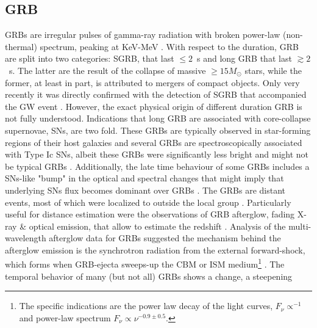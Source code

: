 \subsection{\ac{GRB}}

\acp{GRB} are irregular pulses of gamma-ray radiation with broken power-law 
(non-thermal) spectrum, peaking at KeV-MeV \citep{Band:1993,Kouveliotou:1993,Meegan:1992xg}.
%
With respect to the duration, \ac{GRB} are split into two categories: \ac{SGRB}, 
that last ${\leq}2$~s and long \ac{GRB} that last ${\gtrsim}2$~s. The latter are the 
result of the collapse of massive ${\geq}15M_{\odot}$ stars, while the former, at 
least in part, is attributed to mergers of compact objects. Only very recently it 
was directly confirmed with the detection of \ac{SGRB} \GRB{} that accompanied 
the \ac{GW} event \GW{} \citep{TheLIGOScientific:2017qsa}. However, the exact physical 
origin of different duration \ac{GRB} is not fully understood.
%
Indications that long \ac{GRB} are associated with core-collapse supernovae, \acp{SN}, 
are two fold. These \acp{GRB} are typically observed in star-forming regions of their 
host galaxies \citep[\eg][]{Bloom:2000pq,Bloom:2002hc,Fruchter:2006py,Christensen:2004yx,CastroCeron:2006jh} 
and several \acp{GRB} are spectroscopically associated with Type Ic \acp{SN}, albeit 
these \acp{GRB} were significantly less bright and might not be typical \acp{GRB} 
\citep[\eg][]{Liang:2006ci,Bromberg:2011fm}. Additionally, the late time behaviour 
of some \acp{GRB} includes a \acp{SN}-like "bump" in the optical and spectral changes 
that might imply that underlying \acp{SN} flux becomes dominant over \acp{GRB} 
\citep[\eg][]{Bloom:1999,Woosley:2006fn}.
%
The \acp{GRB} are distant events, most of which were localized to outside the local 
group \citep[\eg][]{Mao:1992,Piran:1992,Fenimore:1993}. Particularly useful for distance 
estimation were the observations of \ac{GRB} afterglow, fading X-ray \& optical emission, 
that allow to estimate the redshift \citep[\eg][]{Costa:1997cg,Frontera:1997ae}.
%
Analysis of the multi-wavelength afterglow data for \acp{GRB} \citep[\eg][]{Panaitescu:2001bx} 
suggested the mechanism behind the afterglow emission is the synchrotron radiation from the 
external forward-shock, which forms when \ac{GRB}-ejecta sweeps-up the \ac{CBM} or \ac{ISM}
medium\footnote{
    The specific indications are the power law decay of the light curves, 
    $F_{\nu}\propto^{-1}$ and power-law spectrum $F_{\nu}\propto\nu^{-0.9\pm 0.5}$.
} 
\citep{Rees:1992ek,Paczynski:1993gz,Meszaros:1993ju,Meszaros:1996sv}.
%
The temporal behavior of many (but not all) \acp{GRB} shows a change, a steepening 
